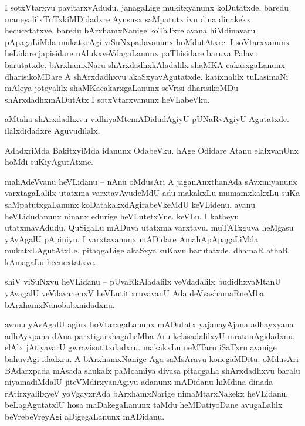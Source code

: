 \documentclass{article}
\begin{document}
\begin{mn}%
I sotxVtarxvu pavitarxvAdudu. janagaLige mukitxyanunx koDutatxde. baredu maneyalilxTuTxkiMDidadxre 
Ayususx saMpatutx ivu dina dinakekx hecucxtatxve. baredu bArxhamxNanige koTaTxre avana hiMdinavaru 
pApagaLiMda mukatxrAgi viSuNxpadavanunx hoMdutAtxre. I soVtarxvanunx heLidare japisidare 
nAlukxveVdagaLanunx paThisidare baruva Palavu barutatxde. bArxhamxNaru shArxdadhxkAladalilx shaMKA 
cakarxgaLanunx dharisikoMDare A shArxdadhxvu akaSxyavAgutatxde. katixnalilx tuLasimaNi mAleya 
joteyalilx shaMKacakarxgaLanunx seVrisi dharisikoMDu shArxdadhxmADutAtx I sotxVtarxvanunx 
heVLabeVku. 
\end{mn}

\begin{mn}%
aMtaha shArxdadhxvu vidhiyaMtemADidudAgiyU pUNaRvAgiyU Agutatxde. ilalxdidadxre Aguvudilalx.
\end{mn}

\begin{mn}%
AdadxriMda BakitxyiMda idanunx OdabeVku. hAge Odidare Atanu elalxvanUnx hoMdi suKiyAgutAtxne.
\end{mn}


\begin{mn}%
mahAdeVvanu heVLidanu -- nAnu oMdusAri A jaganAnxthanAda sAvxmiyanunx varxtagaLalilx utatxma 
varxtavAvudeMdU adu makakxLu mumamxkakxLu suKa saMpatutxgaLanunx koDatakakxdAgirabeVkeMdU 
keVLidenu. avanu heVLidudanunx ninanx edurige heVLutetxVne. keVLu. I katheyu utatxmavAdudu. 
QuSigaLu mADuva utatxma varxtavu. muTATxguva heMgasu yAvAgalU pApiniyu. I varxtavanunx mADidare 
AmahApApagaLiMda mukatxLAgutAtxLe. pitaqgaLige akaSxya suKavu barutatxde. dhamaR athaR kAmagaLu 
hecucxtatxve.
\end{mn}

\begin{mn}%
shiV viSuNxvu heVLidanu -- pUvaRkAladalilx veVdadalilx budidhxvaMtanU yAvagalU veVdavanenxV 
heVLutitixruvavanU Ada deVvashamaRneMba bArxhamxNanobabxnidadxnu.
\end{mn}

\begin{mn}%
avanu yAvAgalU aginx hoVtarxgaLanunx mADutatx yajanayAjana adhayxyana adhAyxpana dAna 
parxtigarxhagaLeMba Aru kelasadalilxyU niratanAgidadxnu. elAlx jAtiyavarU gwravisutitxdadxru. 
makakxLu neMTaru iSaTxru  avanige bahuvAgi idadxru. A bArxhamxNanige Aga saMsAravu konegaMDitu. 
oMdusAri BAdarxpada mAsada shukalx paMcamiya divasa pitaqgaLa shArxdadhxvu baralu niyamadiMdalU 
jiteVMdirxyanAgiyu adanunx mADidanu hiMdina dinada rAtirxyalilxyeV yoVgayxrAda bArxhamxNarige 
nimaMtarxNakekx heVLidanu. beLagAgutatxlU hosa maDakegaLanunx taMdu heMDatiyoDane avugaLalilx 
beVrebeVreyAgi aDigegaLanunx mADidanu.
\end{mn}
\end{document}
